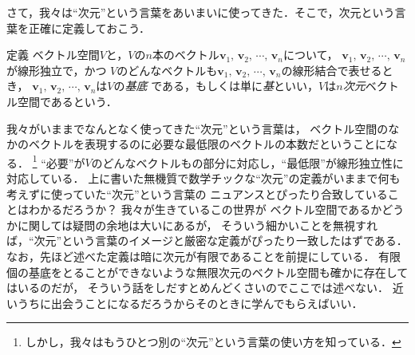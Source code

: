 さて，我々は``次元''という言葉をあいまいに使ってきた．そこで，次元という言葉を正確に定義しておこう．
\begin{itembox}[l]{定義}
ベクトル空間$V$と，$V$の$n$本のベクトル$ \bm{v}_1, \, \bm{v}_2, \, \cdots, \, \bm{v}_n $について，
$ \bm{v}_1, \, \bm{v}_2, \, \cdots, \, \bm{v}_n $が線形独立で，かつ
$V$のどんなベクトルも$ \bm{v}_1, \, \bm{v}_2, \, \cdots, \, \bm{v}_n $の線形結合で表せるとき，
$ \bm{v}_1, \, \bm{v}_2, \, \cdots, \, \bm{v}_n $は$V$の\emph{基底}
である，もしくは単に\emph{基}といい，$V$は\emph{$n$次元}ベクトル空間であるという．
\end{itembox}
我々がいままでなんとなく使ってきた``次元''という言葉は，
ベクトル空間のなかのベクトルを表現するのに必要な最低限のベクトルの本数だということになる．
\footnote{しかし，我々はもうひとつ別の``次元''という言葉の使い方を知っている．}
``必要''が$V$のどんなベクトルもの部分に対応し，``最低限''が線形独立性に対応している．
上に書いた無機質で数学チックな``次元''の定義がいままで何も考えずに使っていた``次元''という言葉の
ニュアンスとぴったり合致していることはわかるだろうか？ 我々が生きているこの世界が
ベクトル空間であるかどうかに関しては疑問の余地は大いにあるが，
そういう細かいことを無視すれば，``次元''という言葉のイメージと厳密な定義がぴったり一致したはずである．
なお，先ほど述べた定義は暗に次元が有限であることを前提にしている．
有限個の基底をとることができないような無限次元のベクトル空間も確かに存在してはいるのだが，
そういう話をしだすとめんどくさいのでここでは述べない．
近いうちに出会うことになるだろうからそのときに学んでもらえばいい．


